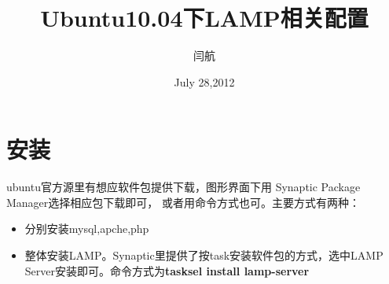 \documentclass[11pt]{article}
\title{\textbf{Ubuntu10.04下LAMP相关配置}}
\author{闫航}
\date{July 28,2012}
\begin{document}
\maketitle


\section{安装}
ubuntu官方源里有想应软件包提供下载，图形界面下用 Synaptic Package Manager选择相应包下载即可，
或者用命令方式也可。主要方式有两种：\\

\begin{itemize}
\item 分别安装mysql,apche,php
\item 整体安装LAMP。Synaptic里提供了按task安装软件包的方式，选中LAMP Server安装即可。命令方式为\textbf{tasksel install lamp-server}
\end{itemize}
\end{document}
